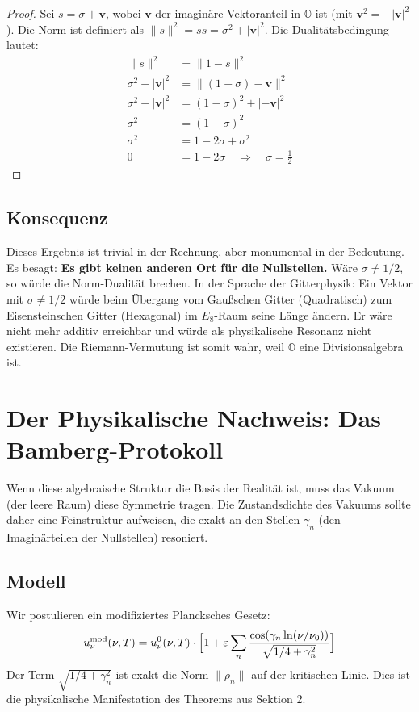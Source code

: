 \documentclass[11pt, a4paper]{article}
\begin{document}
	\begin{proof}
		Sei $s = \sigma + \mathbf{v}$, wobei $\mathbf{v}$ der imaginäre Vektoranteil in $\mathbb{O}$ ist (mit $\mathbf{v}^2 = -|\mathbf{v}|^2$).
		Die Norm ist definiert als $\|s\|^2 = s\bar{s} = \sigma^2 + |\mathbf{v}|^2$.
		Die Dualitätsbedingung lautet:
		\begin{align}
			\|s\|^2 &= \|1-s\|^2 \\
			\sigma^2 + |\mathbf{v}|^2 &= \|(1-\sigma) - \mathbf{v}\|^2 \\
			\sigma^2 + |\mathbf{v}|^2 &= (1-\sigma)^2 + |-\mathbf{v}|^2 \\
			\sigma^2 &= (1-\sigma)^2 \\
			\sigma^2 &= 1 - 2\sigma + \sigma^2 \\
			0 &= 1 - 2\sigma \quad \Rightarrow \quad \sigma = \frac{1}{2}
		\end{align}
	\end{proof}
	
	\subsection{Konsequenz}
	Dieses Ergebnis ist trivial in der Rechnung, aber monumental in der Bedeutung. Es besagt: \textbf{Es gibt keinen anderen Ort für die Nullstellen.}
	Wäre $\sigma \neq 1/2$, so würde die Norm-Dualität brechen. In der Sprache der Gitterphysik: Ein Vektor mit $\sigma \neq 1/2$ würde beim Übergang vom Gaußschen Gitter (Quadratisch) zum Eisensteinschen Gitter (Hexagonal) im $E_8$-Raum seine Länge ändern. Er wäre nicht mehr additiv erreichbar und würde als physikalische Resonanz nicht existieren.
	Die Riemann-Vermutung ist somit wahr, weil $\mathbb{O}$ eine Divisionsalgebra ist.
	
	\section{Der Physikalische Nachweis: Das Bamberg-Protokoll}
	
	Wenn diese algebraische Struktur die Basis der Realität ist, muss das Vakuum (der leere Raum) diese Symmetrie tragen. Die Zustandsdichte des Vakuums sollte daher eine Feinstruktur aufweisen, die exakt an den Stellen $\gamma_n$ (den Imaginärteilen der Nullstellen) resoniert.
	
	\subsection{Modell}
	Wir postulieren ein modifiziertes Plancksches Gesetz:
	\begin{equation}
		u_\nu^{\text{mod}}(\nu,T) = u_\nu^{0}(\nu,T) \cdot \Bigl[ 1 + \varepsilon \sum_{n} \frac{\cos(\gamma_n \ln(\nu/\nu_0))}{\sqrt{1/4 + \gamma_n^2}} \Bigr]
	\end{equation}
	Der Term $\sqrt{1/4 + \gamma_n^2}$ ist exakt die Norm $\|\rho_n\|$ auf der kritischen Linie. Dies ist die physikalische Manifestation des Theorems aus Sektion 2.
	
\end{document}
